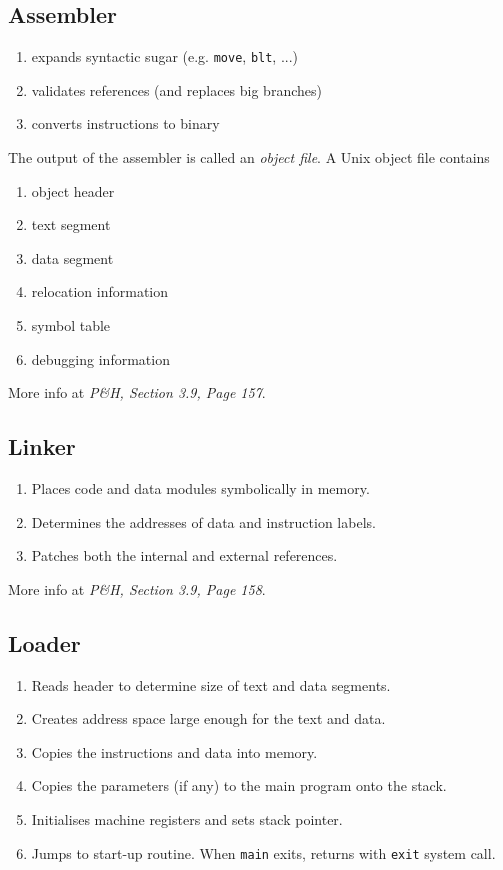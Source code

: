 \documentclass{article}
\theoremstyle{sltheorem}
\newcommand*\T[1]{\texttt{#1}}
\begin{document}
\subsection{Assembler}
\begin{enumerate}
	\item expands syntactic sugar (e.g. \T{move}, \T{blt}, ...)
	\item validates references (and replaces big branches)
	\item converts instructions to binary
\end{enumerate}
The output of the assembler is called an \emph{object file}. A Unix object file contains
\begin{enumerate}
	\item object header
	\item text segment
	\item data segment
	\item relocation information
	\item symbol table
	\item debugging information
\end{enumerate}
More info at \emph{P\&H, Section 3.9, Page 157}.
\subsection{Linker}
\begin{enumerate}
	\item Places code and data modules symbolically in memory.
	\item Determines the addresses of data and instruction labels.
	\item Patches both the internal and external references.
\end{enumerate}
More info at \emph{P\&H, Section 3.9, Page 158}.
\subsection{Loader}
\begin{enumerate}
	\item Reads header to determine size of text and data segments.
	\item Creates address space large enough for the text and data.
	\item Copies the instructions and data into memory.
	\item Copies the parameters (if any) to the main program onto the stack.
	\item Initialises machine registers and sets stack pointer.
	\item Jumps to start-up routine. When \T{main} exits, returns with \T{exit} system call.
\end{enumerate}
\end{document}
